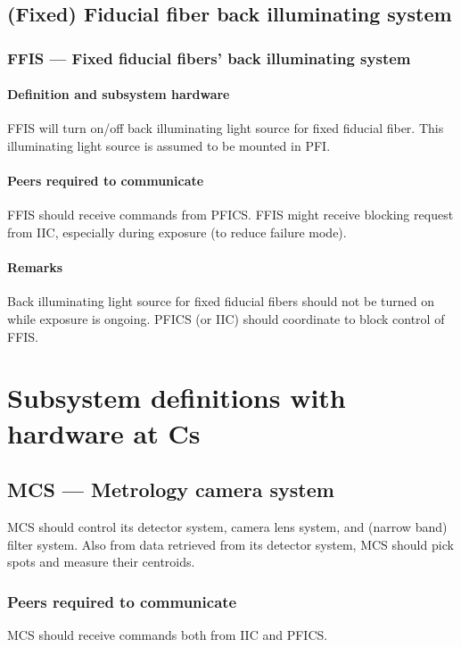 \documentclass[a4paper,notitlepage]{article}
\begin{document}
\subsection{(Fixed) Fiducial fiber back illuminating system}

\subsubsection{FFIS --- Fixed fiducial fibers' back illuminating system}
\paragraph{Definition and subsystem hardware}
FFIS will turn on/off back illuminating light source for fixed fiducial fiber. 
This illuminating light source is assumed to be mounted in PFI. 
\paragraph{Peers required to communicate}
FFIS should receive commands from PFICS. 
FFIS might receive blocking request from IIC, especially during exposure 
(to reduce failure mode). 
\paragraph{Remarks}
Back illuminating light source for fixed fiducial fibers should not be turned 
on while exposure is ongoing. 
PFICS (or IIC) should coordinate to block control of FFIS. 


\section{Subsystem definitions with hardware at Cs}

\subsection{MCS --- Metrology camera system}

MCS should control its detector system, camera lens system, and (narrow band) 
filter system. Also from data retrieved from its detector system, MCS should 
pick spots and measure their centroids. 

\subsubsection{Peers required to communicate}
MCS should receive commands both from IIC and PFICS. 
\end{document}

